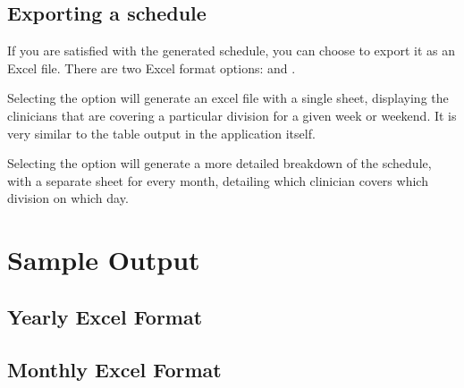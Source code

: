 \documentclass[letterpaper,10pt,english]{sphinxmanual}
\begin{document}
\section{Exporting a schedule}
\label{\detokenize{manual:exporting-a-schedule}}
If you are satisfied with the generated schedule, you can choose to export
it as an Excel file. There are two Excel format options:  and
.

Selecting the  option will generate an excel file with a single
sheet, displaying the clinicians that are covering a particular division
for a given week or weekend. It is very similar to the table output in
the application itself.

\begin{figure}[H]
\centering
{}\end{figure}

Selecting the  option will generate a more detailed breakdown
of the schedule, with a separate sheet for every month, detailing which
clinician covers which division on which day.

\begin{figure}[H]
\centering
{}\end{figure}


\chapter{Sample Output}
\label{\detokenize{manual:sample-output}}

\section{Yearly Excel Format}
\label{\detokenize{manual:yearly-excel-format}}
\begin{figure}[H]
\centering
{}\end{figure}


\section{Monthly Excel Format}
\label{\detokenize{manual:monthly-excel-format}}
\begin{figure}[H]
\centering
{}\end{figure}



\renewcommand{\indexname}{Index}
\printindex
\end{document}

